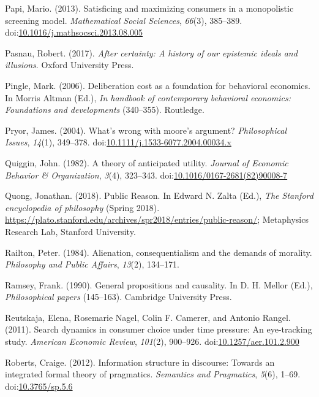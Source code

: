 \documentclass[
  10pt,
  letterpaper,
  twoside]{scrbook}
\newlength{\cslhangindent}
\newenvironment{CSLReferences}[2] %
 {\begin{list}{}{%
  \setlength{\itemindent}{0pt}
  \setlength{\leftmargin}{0pt}
  \setlength{\parsep}{0pt}
  \ifodd #1
   \setlength{\leftmargin}{\cslhangindent}
   \setlength{\itemindent}{-1\cslhangindent}
  \fi
  \setlength{\itemsep}{#2\baselineskip}}}
 {\end{list}}
\begin{document}
\begin{CSLReferences}{1}{0}
Papi, Mario. (2013). Satisficing and maximizing consumers in a
monopolistic screening model. \emph{Mathematical Social Sciences},
\emph{66}(3), 385--389.
doi:\href{https://doi.org/10.1016/j.mathsocsci.2013.08.005}{10.1016/j.mathsocsci.2013.08.005}

Pasnau, Robert. (2017). \emph{After certainty: A history of our
epistemic ideals and illusions}. Oxford University Press.

Pingle, Mark. (2006). Deliberation cost as a foundation for behavioral
economics. In Morris Altman (Ed.), \emph{In handbook of contemporary
behavioral economics: Foundations and developments} (340--355).
Routledge.

Pryor, James. (2004). What's wrong with moore's argument?
\emph{Philosophical Issues}, \emph{14}(1), 349--378.
doi:\href{https://doi.org/10.1111/j.1533-6077.2004.00034.x}{10.1111/j.1533-6077.2004.00034.x}

Quiggin, John. (1982). A theory of anticipated utility. \emph{Journal of
Economic Behavior \& Organization}, \emph{3}(4), 323--343.
doi:\href{https://doi.org/10.1016/0167-2681(82)90008-7}{10.1016/0167-2681(82)90008-7}

Quong, Jonathan. (2018). {Public Reason}. In Edward N. Zalta (Ed.),
\emph{The {Stanford} encyclopedia of philosophy} ({S}pring 2018).
\url{https://plato.stanford.edu/archives/spr2018/entries/public-reason/};
Metaphysics Research Lab, Stanford University.

Railton, Peter. (1984). Alienation, consequentialism and the demands of
morality. \emph{Philosophy and Public Affairs}, \emph{13}(2), 134--171.

Ramsey, Frank. (1990). General propositions and causality. In D. H.
Mellor (Ed.), \emph{Philosophical papers} (145--163). Cambridge
University Press.

Reutskaja, Elena, Rosemarie Nagel, Colin F. Camerer, and Antonio Rangel.
(2011). Search dynamics in consumer choice under time pressure: An
eye-tracking study. \emph{American Economic Review}, \emph{101}(2),
900--926.
doi:\href{https://doi.org/10.1257/aer.101.2.900}{10.1257/aer.101.2.900}

Roberts, Craige. (2012). Information structure in discourse: Towards an
integrated formal theory of pragmatics. \emph{Semantics and Pragmatics},
\emph{5}(6), 1--69.
doi:\href{https://doi.org/10.3765/sp.5.6}{10.3765/sp.5.6}


\end{CSLReferences}
\end{document}
